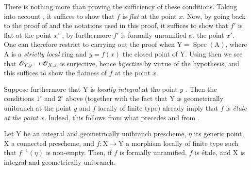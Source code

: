 \begin{remark}[18.10.2]
\begin{enumerate}[label=(\roman*)]
There is nothing more than proving the sufficiency of these conditions.
Taking into account , it suffices to show that $f$ is \emph{flat} at the point $x$.
Now, by going back to the proof of  and the notations used in this proof, it suffices to show that $f'$ is flat at the point $x'$ ; by  furthermore $f'$ is formally unramified at the point $x'$.
One can therefore restrict to carrying out the proof when $\mathrm{Y}=\operatorname{Spec}(\mathrm{A})$, where $\mathrm{A}$ is a \emph{strictly local} ring and $y=f(x)$ the closed point of $\mathrm{Y}$.
Using then  we see that $\mathscr{O}_{Y,y}\to\mathscr{O}_{X,x}$ is surjective, hence \emph{bijective} by virtue of the hypothesis, and this suffices to show the flatness of $f$ at the point $x$.

Suppose furthermore that $\mathrm{Y}$ is \emph{locally integral} at the point $y$ .
Then the conditions $1^{\circ}$ and $2^{\circ}$ above (together with the fact that $\mathrm{Y}$ is geometrically unibranch at the point $y$ and $f$ locally of finite type) already imply that $f$ is \emph{\'etale at the point} $x$.
Indeed, this follows from what precedes and from .
\end{enumerate}
\end{remark}

\begin{corollary}[18.10.3]
\label{IV.18.10.3}
Let $\mathrm{Y}$ be an integral and geometrically unibranch prescheme, $\eta$ its generic point, $\mathrm{X}$ a connected prescheme, and $f:\mathrm{X}\to\mathrm{Y}$ a morphism locally of finite type such that $f^{-1}(\eta)$ is non-empty.
Then, if $f$ is formally unramified, $f$ is \'etale, and $\mathrm{X}$ is integral and geometrically unibranch.
\end{corollary}

